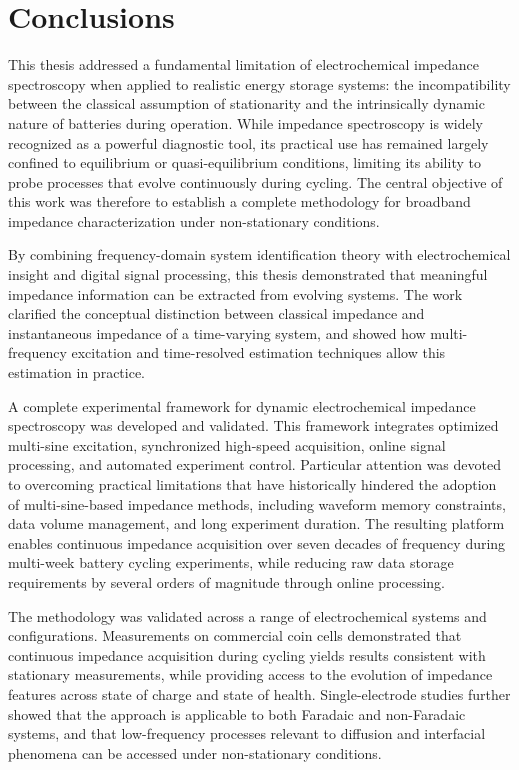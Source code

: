 \chapter{Conclusions}
\label{ch:conclusions}

This thesis addressed a fundamental limitation of electrochemical impedance spectroscopy when applied to realistic energy storage systems: the incompatibility between the classical assumption of stationarity and the intrinsically dynamic nature of batteries during operation. 
While impedance spectroscopy is widely recognized as a powerful diagnostic tool, its practical use has remained largely confined to equilibrium or quasi-equilibrium conditions, limiting its ability to probe processes that evolve continuously during cycling. 
The central objective of this work was therefore to establish a complete methodology for broadband impedance characterization under non-stationary conditions.

By combining frequency-domain system identification theory with electrochemical insight and digital signal processing, this thesis demonstrated that meaningful impedance information can be extracted from evolving systems. 
The work clarified the conceptual distinction between classical impedance and instantaneous impedance of a time-varying system, and showed how multi-frequency excitation and time-resolved estimation techniques allow this estimation in practice.

A complete experimental framework for dynamic electrochemical impedance spectroscopy was developed and validated. 
This framework integrates optimized multi-sine excitation, synchronized high-speed acquisition, online signal processing, and automated experiment control. 
Particular attention was devoted to overcoming practical limitations that have historically hindered the adoption of multi-sine-based impedance methods, including waveform memory constraints, data volume management, and long experiment duration. 
The resulting platform enables continuous impedance acquisition over seven decades of frequency during multi-week battery cycling experiments, while reducing raw data storage requirements by several orders of magnitude through online processing.

The methodology was validated across a range of electrochemical systems and configurations. 
Measurements on commercial coin cells demonstrated that continuous impedance acquisition during cycling yields results consistent with stationary measurements, while providing access to the evolution of impedance features across state of charge and state of health. 
Single-electrode studies further showed that the approach is applicable to both Faradaic and non-Faradaic systems, and that low-frequency processes relevant to diffusion and interfacial phenomena can be accessed under non-stationary conditions. 

